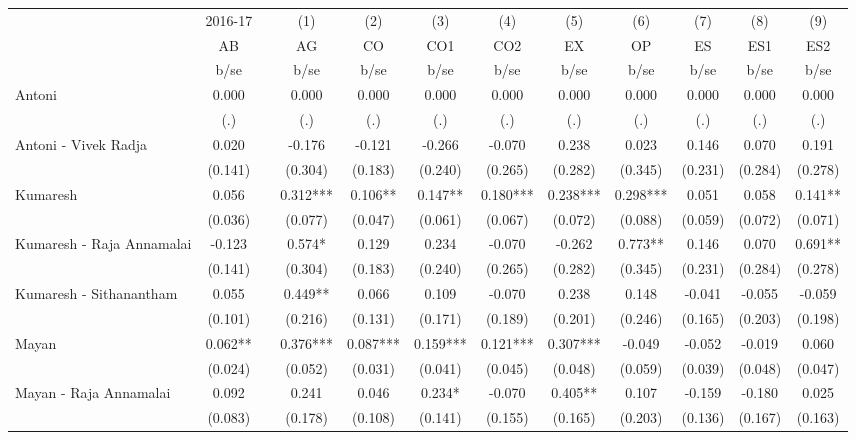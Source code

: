 \begin{table}[htbp]
  \centering
    \begin{tabular}{lccccccccccc}
    \toprule
      & 2016-17 &   & (1) & (2) & (3) & (4) & (5) & (6) & (7) & (8) & (9) \\
      & AB &   & AG & CO & CO1 & CO2 & EX & OP & ES & ES1 & ES2 \\
      & b/se &   & b/se & b/se & b/se & b/se & b/se & b/se & b/se & b/se & b/se \\
    \midrule
    Antoni & 0.000 &   & 0.000 & 0.000 & 0.000 & 0.000 & 0.000 & 0.000 & 0.000 & 0.000 & 0.000 \\
      & (.) &   & (.) & (.) & (.) & (.) & (.) & (.) & (.) & (.) & (.) \\
    Antoni - Vivek Radja & 0.020 &   & -0.176 & -0.121 & -0.266 & -0.070 & 0.238 & 0.023 & 0.146 & 0.070 & 0.191 \\
      & (0.141) &   & (0.304) & (0.183) & (0.240) & (0.265) & (0.282) & (0.345) & (0.231) & (0.284) & (0.278) \\
    Kumaresh & 0.056 &   & 0.312*** & 0.106** & 0.147** & 0.180*** & 0.238*** & 0.298*** & 0.051 & 0.058 & 0.141** \\
      & (0.036) &   & (0.077) & (0.047) & (0.061) & (0.067) & (0.072) & (0.088) & (0.059) & (0.072) & (0.071) \\
    Kumaresh - Raja Annamalai & -0.123 &   & 0.574* & 0.129 & 0.234 & -0.070 & -0.262 & 0.773** & 0.146 & 0.070 & 0.691** \\
      & (0.141) &   & (0.304) & (0.183) & (0.240) & (0.265) & (0.282) & (0.345) & (0.231) & (0.284) & (0.278) \\
    Kumaresh - Sithanantham & 0.055 &   & 0.449** & 0.066 & 0.109 & -0.070 & 0.238 & 0.148 & -0.041 & -0.055 & -0.059 \\
      & (0.101) &   & (0.216) & (0.131) & (0.171) & (0.189) & (0.201) & (0.246) & (0.165) & (0.203) & (0.198) \\
    Mayan & 0.062** &   & 0.376*** & 0.087*** & 0.159*** & 0.121*** & 0.307*** & -0.049 & -0.052 & -0.019 & 0.060 \\
      & (0.024) &   & (0.052) & (0.031) & (0.041) & (0.045) & (0.048) & (0.059) & (0.039) & (0.048) & (0.047) \\
    Mayan - Raja Annamalai & 0.092 &   & 0.241 & 0.046 & 0.234* & -0.070 & 0.405** & 0.107 & -0.159 & -0.180 & 0.025 \\
      & (0.083) &   & (0.178) & (0.108) & (0.141) & (0.155) & (0.165) & (0.203) & (0.136) & (0.167) & (0.163) \\

\end{tabular}
\end{table}

